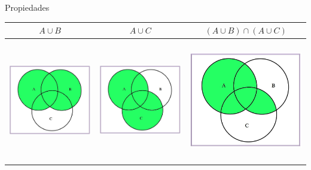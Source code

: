 \documentclass[
  ignorenonframetext,
]{beamer}
\begin{document}
\begin{frame}{Propiedades}
\protect\hypertarget{propiedades-2}{}
\begin{longtable}[]{@{}ccc@{}}
\toprule
\(A\cup B\) & \(A\cup C\) & \((A\cup B)\cap (A\cup C)\) \\
\midrule
\endhead
\includegraphics[width=\textwidth,height=2.08333in]{Images/proba1dibujos/distr21.jpg}
&
\includegraphics[width=\textwidth,height=2.08333in]{Images/proba1dibujos/distr22.jpg}
&
\includegraphics[width=\textwidth,height=2.08333in]{Images/proba1dibujos/distr23.jpg} \\
\bottomrule
\end{longtable}
\end{frame}
\end{document}
